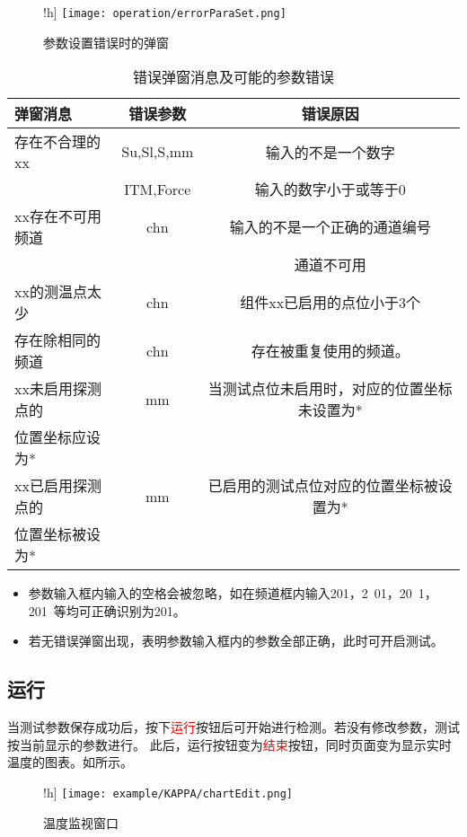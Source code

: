 \begin{figure}!h]
    \centering
    \texttt{[image: operation/errorParaSet.png]}
    \caption{ 参数设置错误时的弹窗 \label{fig:errorParaSet}}
\end{figure}
\begin{table}[htbp]
    \centering
    \caption{ 错误弹窗消息及可能的参数错误 \label{tab:errorInfoNormalUser}}
    \begin{tabular}{@{}lcc@{}}
        \toprule
        弹窗消息                        & 错误参数   & 错误原因                                    \\ \midrule
        存在不合理的xx                  & Su,Sl,S,mm & 输入的不是一个数字                          \\
                                        & ITM,Force  & 输入的数字小于或等于0                       \\
        xx存在不可用频道                & chn        & 输入的不是一个正确的通道编号                \\
                                        &            & 通道不可用                                  \\
        xx的测温点太少                  & chn        & 组件xx已启用的点位小于3个                   \\
        存在除相同的频道                & chn        & 存在被重复使用的频道。                      \\
        xx未启用探测点的 & mm         & 当测试点位未启用时，对应的位置坐标未设置为* \\
        位置坐标应设为*& & \\
        xx已启用探测点的 & mm         & 已启用的测试点位对应的位置坐标被设置为*     \\
        位置坐标被设为* & & \\
        \bottomrule
    \end{tabular}
\end{table}
\begin{note}
    \begin{itemize}
        \item 参数输入框内输入的空格会被忽略，如在频道框内输入201，2\ 01，20\ 1，201\ 等均可正确识别为201。
        \item 若无错误弹窗出现，表明参数输入框内的参数全部正确，此时可开启测试。
    \end{itemize}
\end{note}
\subsection{运行}
当测试参数保存成功后，按下\textcolor{red}{运行}按钮后可开始进行检测。若没有修改参数，测试按当前显示的参数进行。
此后，运行按钮变为\textcolor{red}{结束}按钮，同时页面变为显示实时温度的图表。如所示。
\begin{figure}!h]
    \centering
    \texttt{[image: example/KAPPA/chartEdit.png]}
    \caption{ 温度监视窗口 \label{fig:tempChart}}
\end{figure}
